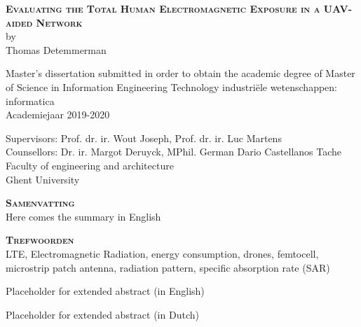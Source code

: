 \begin{center}
\textsc{\textbf{\Huge Evaluating the Total Human Electromagnetic Exposure in a UAV-aided Network}}\\

by\\
Thomas Detemmerman

Master's dissertation submitted in order to obtain the academic degree of Master of Science in Information Engineering Technology
industri\"ele wetenschappen: informatica\\
Academiejaar 2019-2020

Supervisors: Prof. dr. ir. Wout Joseph, Prof. dr. ir. Luc Martens\\
Counsellors: Dr. ir. Margot Deruyck, MPhil. German Dario Castellanos Tache\\
Faculty of engineering and architecture\\
Ghent University
\end{center}

\textsc{\textbf{\LARGE Samenvatting}}\\

Here comes the summary in English

\textsc{\textbf{\LARGE Trefwoorden}}\\

LTE, Electromagnetic Radiation, energy consumption, drones, femtocell, microstrip patch antenna, radiation pattern, specific absorption rate (SAR)

\clearpage
Placeholder for extended abstract (in English)

\clearpage
Placeholder for extended abstract (in Dutch)